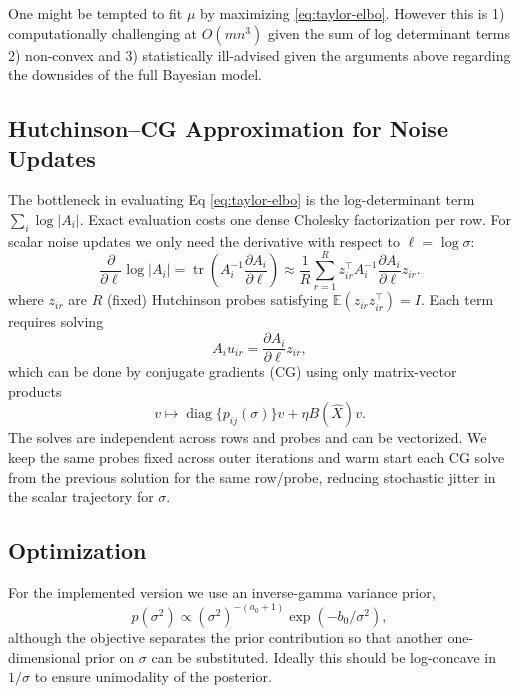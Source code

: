 \documentclass[11pt]{article}
\begin{document}
One might be tempted to fit $\mu$ by maximizing \eqref{eq:taylor-elbo}. However this is 1) computationally challenging at $O(mn^3)$ given the sum of log determinant terms 2) non-convex and 3) statistically ill-advised given the arguments above regarding the downsides of the full Bayesian model. 

\subsection{Hutchinson--CG Approximation for Noise Updates}

The bottleneck in evaluating Eq \eqref{eq:taylor-elbo} is the log-determinant term
$\sum_i\log|A_i|$.  Exact evaluation costs one dense Cholesky factorization
per row.  For scalar noise updates we only need the derivative with respect to
$\ell=\log \sigma$:
\begin{equation} 
    \frac{\partial}{\partial \ell} \log |A_i| = \operatorname{tr} \left(A_i^{-1}\frac{\partial A_i}{\partial \ell} \right)
    \approx \frac{1}{R} \sum_{r=1}^R z_{ir}^\top A_i^{-1} \frac{\partial A_i}{\partial \ell} z_{ir}.
\end{equation}
where $z_{ir}$ are $R$ (fixed) Hutchinson probes satisfying $\mathbb{E}(z_{ir}z_{ir}^\top)=I$. Each term requires solving
\begin{equation} 
    A_i u_{ir} = \frac{\partial A_i}{\partial \ell}z_{ir},
\end{equation}
which can be done by conjugate gradients (CG) using only matrix-vector products
\begin{equation} 
    v \mapsto \operatorname{diag}\{p_{ij}(\sigma)\}v + \eta B(\hat X)v.
\end{equation}
The solves are independent across rows and probes and can be vectorized.  We keep the same probes fixed across outer iterations and warm start each CG solve from the previous solution for the same row/probe, reducing stochastic jitter in the scalar trajectory for $\sigma$.

\subsection{Optimization}

For the implemented version we use an inverse-gamma variance prior,
\begin{equation} p(\sigma^2) \propto (\sigma^2)^{-(a_0+1)}\exp(-b_0/\sigma^2),
\end{equation}
although the objective separates the prior contribution so that another one-dimensional prior on $\sigma$ can be substituted. Ideally this should be log-concave in $1/\sigma$ to ensure unimodality of the posterior.
\end{document}
